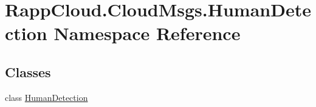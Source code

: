 \hypertarget{namespaceRappCloud_1_1CloudMsgs_1_1HumanDetection}{\section{Rapp\-Cloud.\-Cloud\-Msgs.\-Human\-Detection Namespace Reference}
\label{namespaceRappCloud_1_1CloudMsgs_1_1HumanDetection}
}
\subsection*{Classes}
\begin{DoxyCompactItemize}
\item 
class \hyperlink{classRappCloud_1_1CloudMsgs_1_1HumanDetection_1_1HumanDetection}{Human\-Detection}
\end{DoxyCompactItemize}
